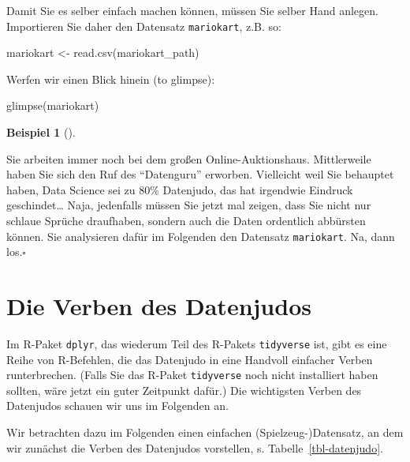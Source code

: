 \documentclass[
  a4paper,
]{scrbook}
\newenvironment{Shaded}{\begin{snugshade}}{\end{snugshade}}
\newcommand{\FunctionTok}[1]{\textcolor[rgb]{0.28,0.35,0.67}{#1}}
\newcommand{\NormalTok}[1]{\textcolor[rgb]{0.00,0.23,0.31}{#1}}
\newcommand{\OtherTok}[1]{\textcolor[rgb]{0.00,0.23,0.31}{#1}}
\theoremstyle{definition}
\newtheorem{example}{Beispiel}[chapter]
\theoremstyle{definition}
\theoremstyle{definition}
\theoremstyle{remark}
\begin{document}
Damit Sie es selber einfach machen können, müssen Sie selber Hand
anlegen. Importieren Sie daher den Datensatz \texttt{mariokart}, z.B.
so:

\begin{Shaded}
\begin{Highlighting}[]
\NormalTok{mariokart }\OtherTok{\textless{}{-}} \FunctionTok{read.csv}\NormalTok{(mariokart\_path)}
\end{Highlighting}
\end{Shaded}

Werfen wir einen Blick hinein (to glimpse):

\begin{Shaded}
\begin{Highlighting}[]
\FunctionTok{glimpse}\NormalTok{(mariokart)}
\end{Highlighting}
\end{Shaded}

\begin{example}[]\protect\hypertarget{exm-datenjudo}{}\label{exm-datenjudo}

Sie arbeiten immer noch bei dem großen Online-Auktionshaus. Mittlerweile
haben Sie sich den Ruf des ``Datenguru'' erworben. Vielleicht weil Sie
behauptet haben, Data Science sei zu 80\% Datenjudo, das hat irgendwie
Eindruck geschindet\ldots{} Naja, jedenfalls müssen Sie jetzt mal
zeigen, dass Sie nicht nur schlaue Sprüche draufhaben, sondern auch die
Daten ordentlich abbürsten können. Sie analysieren dafür im Folgenden
den Datensatz \texttt{mariokart}. Na, dann los.\(\square\)

\end{example}

\section{Die Verben des Datenjudos}\label{die-verben-des-datenjudos}

Im R-Paket \texttt{dplyr}, das wiederum Teil des R-Pakets
\texttt{tidyverse} ist, gibt es eine Reihe von R-Befehlen, die das
Datenjudo in eine Handvoll einfacher Verben runterbrechen. (Falls Sie
das R-Paket \texttt{tidyverse} noch nicht installiert haben sollten,
wäre jetzt ein guter Zeitpunkt dafür.) Die wichtigsten Verben des
Datenjudos schauen wir uns im Folgenden an.

Wir betrachten dazu im Folgenden einen einfachen (Spielzeug-)Datensatz,
an dem wir zunächst die Verben des Datenjudos vorstellen, s.
Tabelle~\ref{tbl-datenjudo}.
\end{document}
